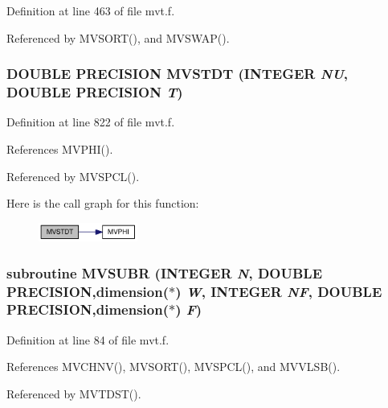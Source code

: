 Definition at line 463 of file mvt.f.

Referenced by MVSORT(), and MVSWAP().\hypertarget{mvt_8f_33d5a1ab44132a99ec34a2a0c899cdcb}{
\subsubsection[{MVSTDT}]{\setlength{\rightskip}{0pt plus 5cm}DOUBLE PRECISION MVSTDT (INTEGER {\em NU}, \/  DOUBLE PRECISION {\em T})}}
\label{mvt_8f_33d5a1ab44132a99ec34a2a0c899cdcb}




Definition at line 822 of file mvt.f.

References MVPHI().

Referenced by MVSPCL().

Here is the call graph for this function:\nopagebreak
\begin{figure}[H]
\begin{center}
\leavevmode
\includegraphics[width=92pt]{mvt_8f_33d5a1ab44132a99ec34a2a0c899cdcb_cgraph}
\end{center}
\end{figure}
\hypertarget{mvt_8f_1e3a3eb63d17fe37f686fc1f571beccc}{
\subsubsection[{MVSUBR}]{\setlength{\rightskip}{0pt plus 5cm}subroutine MVSUBR (INTEGER {\em N}, \/  DOUBLE PRECISION,dimension($\ast$) {\em W}, \/  INTEGER {\em NF}, \/  DOUBLE PRECISION,dimension($\ast$) {\em F})}}
\label{mvt_8f_1e3a3eb63d17fe37f686fc1f571beccc}




Definition at line 84 of file mvt.f.

References MVCHNV(), MVSORT(), MVSPCL(), and MVVLSB().

Referenced by MVTDST().

